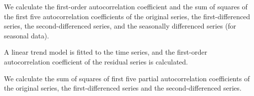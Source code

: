 \documentclass[11pt,a4paper,]{article}
\theoremstyle{definition}
\theoremstyle{definition}
\theoremstyle{definition}
\theoremstyle{remark}
\begin{document}
We calculate the first-order autocorrelation coefficient and the sum of
squares of the first five autocorrelation coefficients of the original
series, the first-differenced series, the second-differenced series, and
the seasonally differenced series (for seasonal data).

A linear trend model is fitted to the time series, and the first-order
autocorrelation coefficient of the residual series is calculated.

We calculate the sum of squares of first five partial autocorrelation
coefficients of the original series, the first-differenced series and
the second-differenced series.

\newpage

\printbibliography[title=References]
\end{document}

